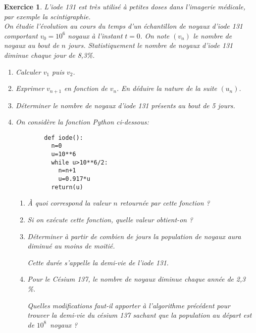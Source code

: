 \documentclass[10pt,a4paper]{article}
\theoremstyle{break}
\newtheorem{exo}{Exercice}
\begin{document}
\begin{exo}
L'iode 131 est très utilisé à petites doses dans l'imagerie médicale, par exemple la scintigraphie.\\
On étudie l'évolution au cours du temps d'un échantillon de noyaux d'iode 131 comportant $v_0 = 10^6$ noyaux à l'instant $t = 0$. On note $(v_n)$ le nombre de noyaux au bout de $n$ jours. Statistiquement le nombre de noyaux d'iode 131 diminue chaque jour de 8,3\%.

	\begin{enumerate}
		\item Calculer $v_{1}$ puis $v_{2}$. 
		\item Exprimer $v_{n+1}$ en fonction de $v_{n}$. En déduire la nature de la suite $\left(u_{n}\right)$. 
		\item  Déterminer le nombre de noyaux d'iode 131 présents au bout de 5 jours. 
	
		\item On considère la fonction Python ci-dessous:\\
			\begin{lstlisting}
		def iode():
		  n=0
		  u=10**6
		  while u>10**6/2:
		    n=n+1
		    u=0.917*u
		  return(u)
		\end{lstlisting}
			\begin{enumerate}
			\item À quoi correspond la valeur $n$ retournée par cette fonction ? 
			\item Si on exécute cette fonction, quelle valeur obtient-on ? 
			\item Déterminer à partir de combien de jours la population de noyaux aura diminué au moins de moitié.
			
			Cette durée s'appelle la demi-vie de l'iode 131. 
			\item Pour le Césium 137, le nombre de noyaux diminue chaque année de 2,3\,\%.
			
			Quelles modifications faut-il apporter à l'algorithme précédent pour trouver la demi-vie du césium 137 sachant que la population au départ est de $10^8$~noyaux ?
		\end{enumerate} 
	\end{enumerate}
	
	

	
	
\end{exo}

	
\end{document}
